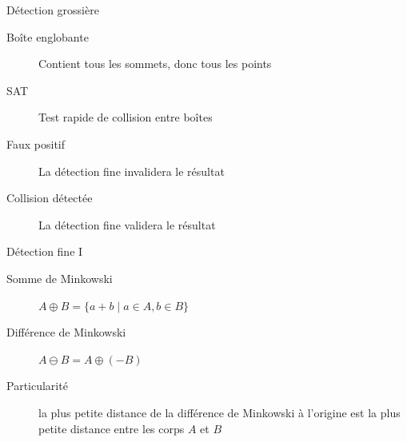 \documentclass{beamer}
\begin{document}
\begin{frame}{Détection grossière}
  \begin{overprint}

    \begin{figure}
      \centering
      
    \end{figure}
    \begin{description}
    \item[Boîte englobante] Contient tous les sommets, donc tous les points
    \item[SAT] Test rapide de collision entre boîtes
    \end{description}

    \begin{figure}
      \centering
      
    \end{figure}
    \begin{description}
    \item[Faux positif] La détection fine invalidera le résultat
    \end{description}

    \begin{figure}
      \centering
      
    \end{figure}
    \begin{description}
    \item[Collision détectée] La détection fine validera le résultat
    \end{description}

  \end{overprint}
\end{frame}

\begin{frame}{Détection fine I}
  \begin{description}
  \item[Somme de Minkowski]
    $A \oplus B = \{a + b \mid a \in A, b \in B\}$
  \item[Différence de Minkowski]
    $A \ominus B = A \oplus (-B)$
  \end{description}

  \begin{figure}
    \centering
    
    
  \end{figure}

  \begin{description}
  \item[Particularité]
    la plus petite distance de la différence de Minkowski à l'origine est la plus petite distance entre les corps $A$ et $B$
  \end{description}
\end{frame}
\end{document}
